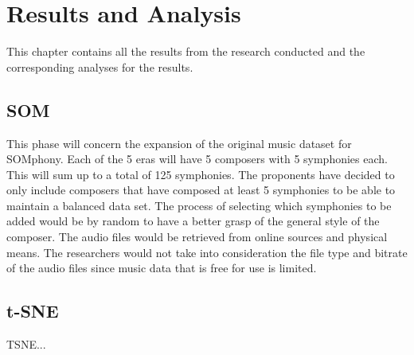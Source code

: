 %
%
%                 

\chapter{Results and Analysis}
This chapter contains all the results from the research conducted and the corresponding analyses for the results.

\section{SOM}

This phase will concern the  expansion of the original music dataset for SOMphony. Each of the 5 eras will have 5 composers with 5 symphonies each. This will sum up to a total of 125 symphonies. The proponents have decided to only include composers that have composed at least 5 symphonies to be able to maintain a balanced data set. The process of selecting which symphonies to be added would be by random to have a better grasp of the general style of the composer. The audio files would be retrieved from online sources and physical means. The researchers would not take into consideration the file type and bitrate of the audio files since music data that is free for use is limited.

\section{t-SNE}
TSNE...

